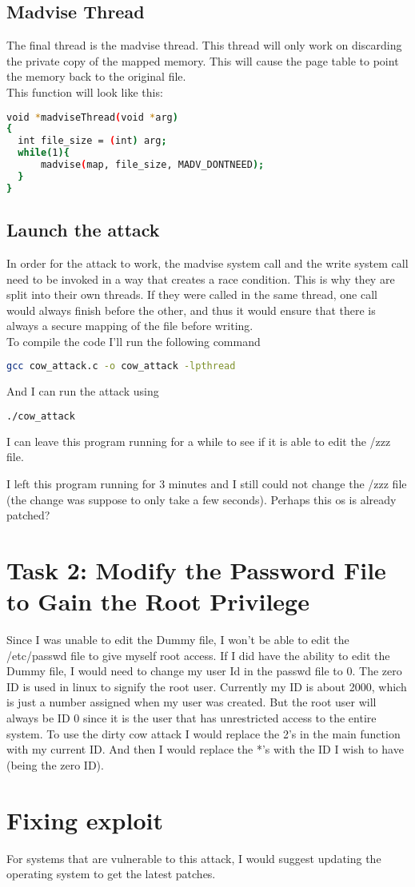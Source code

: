 \documentclass[14pt]{extarticle}
\begin{document}
\subsection{Madvise Thread}
The final thread is the madvise thread. This thread will only work on discarding the private copy of the mapped memory. This will cause the page table to point the memory back to the original file.\\
This function will look like this\cite{seed-dirtycow}:
\begin{lstlisting}[language=sh]
void *madviseThread(void *arg)
{
  int file_size = (int) arg;
  while(1){
      madvise(map, file_size, MADV_DONTNEED);
  }
}
\end{lstlisting}


\subsection{Launch the attack}
In order for the attack to work, the madvise system call  and the write system call need to be invoked in a way that creates a race condition. This is why they are split into their own threads. If they were called in the same thread, one call would always finish before the other, and thus it would ensure that there is always a secure mapping of the file before writing.\\
To compile the code I'll run the following command
\begin{lstlisting}[language=sh]
gcc cow_attack.c -o cow_attack -lpthread
\end{lstlisting}
And I can run the attack using
\begin{lstlisting}[language=sh]
./cow_attack
\end{lstlisting}

I can leave this program running for a while to see if it is able to edit the /zzz file\cite{seed-dirtycow}.

I left this program running for 3 minutes and I still could not change the /zzz file (the change was suppose to only take a few seconds). Perhaps this os is already patched?

\section{Task 2: Modify the Password File to Gain the Root Privilege}
Since I was unable to edit the Dummy file, I won't be able to edit the /etc/passwd file to give myself root access.
If I did have the ability to edit the Dummy file, I would need to change my user Id in the passwd file to 0. The zero ID is used in linux to signify the root user\cite{seed-dirtycow}. Currently my ID is about 2000, which is just a number assigned when my user was created. But the root user will always be ID 0 since it is the user that has unrestricted access to the entire system. To use the dirty cow attack I would replace the 2's in the main function with my current ID. And then I would replace the *'s with the ID I wish to have (being the zero ID).


\section{Fixing exploit}
For systems that are vulnerable to this attack, I would suggest updating the operating system to get the latest patches.



\newpage


\end{document}
